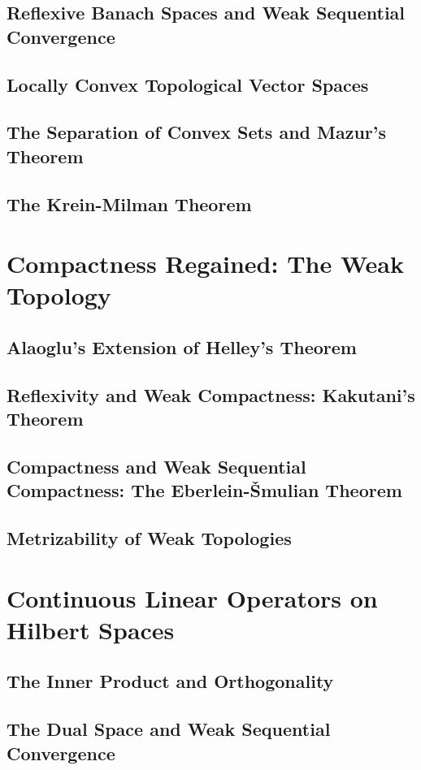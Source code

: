 \documentclass[a4paper,10pt]{book}
\theoremstyle{plain} %
\begin{document}
\section{Reflexive Banach Spaces and Weak Sequential Convergence}
\section{Locally Convex Topological Vector Spaces}
\section{The Separation of Convex Sets and Mazur's Theorem}
\section{The Krein-Milman Theorem}

\chapter{Compactness Regained: The Weak Topology}

\section{Alaoglu's Extension of Helley's Theorem}
\section{Reflexivity and Weak Compactness: Kakutani's Theorem}
\section{Compactness and Weak Sequential Compactness: The Eberlein-\v Smulian Theorem}
\section{Metrizability of Weak Topologies}

\chapter{Continuous Linear Operators on Hilbert Spaces}

\section{The Inner Product and Orthogonality}
\section{The Dual Space and Weak Sequential Convergence}
\end{document}
